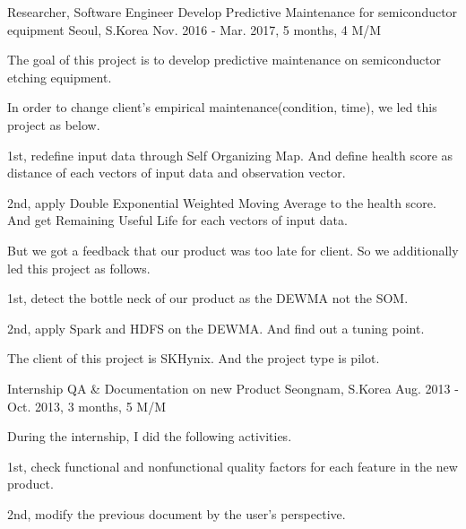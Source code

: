 \begin{cventries}
  \cventry
    {Researcher, Software Engineer} %
    {Develop Predictive Maintenance for semiconductor equipment} %
    {Seoul, S.Korea} %
    {Nov. 2016 - Mar. 2017, 5 months, 4 M/M} %
    {
      \begin{cvitems} %
        \item {The goal of this project is to develop predictive maintenance on semiconductor etching equipment.}
        \item {In order to change client's empirical maintenance(condition, time), we led this project as below.}
        \item {1st, redefine input data through Self Organizing Map. And define health score as distance of each vectors of input data and observation vector.}
        \item {2nd, apply Double Exponential Weighted Moving Average to the health score. And get Remaining Useful Life for each vectors of input data.}
        \item {But we got a feedback that our product was too late for client. So we additionally led this project as follows.}
        \item {1st, detect the bottle neck of our product as the DEWMA not the SOM.}
        \item {2nd, apply Spark and HDFS on the DEWMA. And find out a tuning point.}
        \item {The client of this project is SKHynix. And the project type is pilot.}
      \end{cvitems}
    }

  \cventry
    {Internship} %
    {QA \& Documentation on new Product} %
    {Seongnam, S.Korea} %
    {Aug. 2013 - Oct. 2013, 3 months, 5 M/M} %
    {
      \begin{cvitems} %
        \item {During the internship, I did the following activities.}
        \item {1st, check functional and nonfunctional quality factors for each feature in the new product.}
        \item {2nd, modify the previous document by the user's perspective.}
      \end{cvitems}
    }

\end{cventries}
